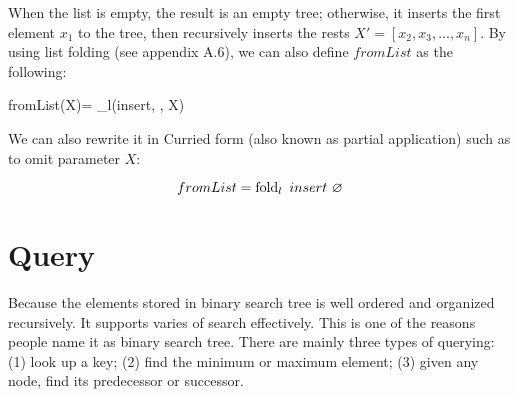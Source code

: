 \documentclass[b5paper]{article}
\begin{document}
When the list is empty, the result is an empty tree; otherwise, it inserts the first element $x_1$ to the tree, then recursively inserts the rests $X' = [x_2, x_3, ..., x_n]$. By using list folding\cite{wiki-fold} (see appendix A.6), we can also define $fromList$ as the following:

\be
  fromList(X)= \fold_l(insert, \nil, X)
\ee

We can also rewrite it in Curried form\cite{curry} (also known as partial application) such as to omit parameter $X$:

\[
  fromList = \fold_l\ insert\ \nil
\]

\begin{Exercise}



\end{Exercise}

\section{Query}

Because the elements stored in binary search tree is well ordered and organized recursively. It supports varies of search effectively. This is one of the reasons people name it as binary search tree. There are mainly three types of querying: (1) look up a key; (2) find the minimum or maximum element; (3) given any node, find its predecessor or successor.
\end{document}
